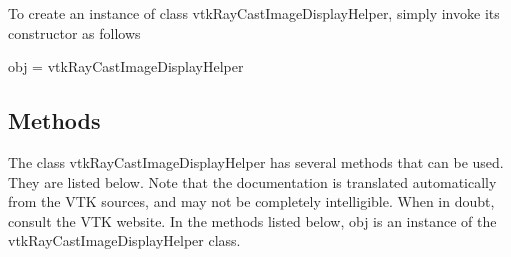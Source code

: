 To create an instance of class vtk\-Ray\-Cast\-Image\-Display\-Helper, simply invoke its constructor as follows \begin{DoxyVerb}  obj = vtkRayCastImageDisplayHelper
\end{DoxyVerb}
 \hypertarget{vtkwidgets_vtkxyplotwidget_Methods}{}\subsection{Methods}\label{vtkwidgets_vtkxyplotwidget_Methods}
The class vtk\-Ray\-Cast\-Image\-Display\-Helper has several methods that can be used. They are listed below. Note that the documentation is translated automatically from the V\-T\-K sources, and may not be completely intelligible. When in doubt, consult the V\-T\-K website. In the methods listed below, {\ttfamily obj} is an instance of the vtk\-Ray\-Cast\-Image\-Display\-Helper class. 
